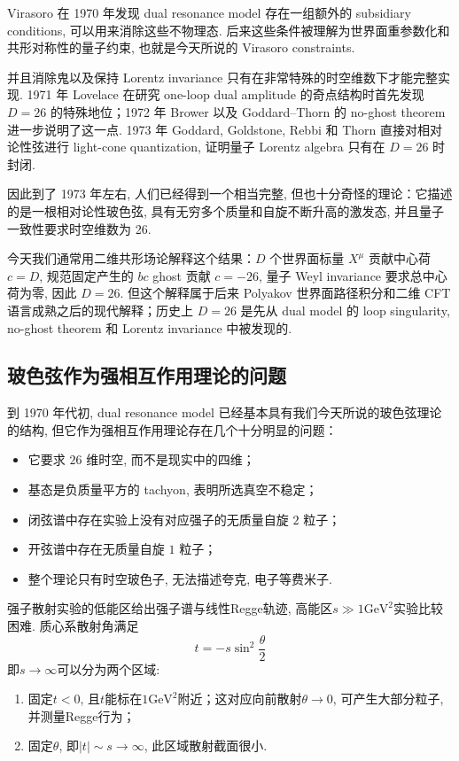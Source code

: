 \documentclass[10pt]{article}
\numberwithin{equation}{section}
\begin{document}
Virasoro 在 1970 年发现 dual resonance model 存在一组额外的 subsidiary conditions, 可以用来消除这些不物理态. 后来这些条件被理解为世界面重参数化和共形对称性的量子约束, 也就是今天所说的 Virasoro constraints. 

并且消除鬼以及保持 Lorentz invariance 只有在非常特殊的时空维数下才能完整实现. 1971 年 Lovelace 在研究 one-loop dual amplitude 的奇点结构时首先发现 $D=26$ 的特殊地位；1972 年 Brower 以及 Goddard–Thorn 的 no-ghost theorem 进一步说明了这一点\cite{Lovelace1971,Brower1972,GoddardThorn1972}. 1973 年 Goddard, Goldstone, Rebbi 和 Thorn 直接对相对论性弦进行 light-cone quantization, 证明量子 Lorentz algebra 只有在 $D=26$ 时封闭\cite{GGRT1973}.

因此到了 1973 年左右, 人们已经得到一个相当完整, 但也十分奇怪的理论：它描述的是一根相对论性玻色弦, 具有无穷多个质量和自旋不断升高的激发态, 并且量子一致性要求时空维数为 26. 

今天我们通常用二维共形场论解释这个结果：$D$ 个世界面标量 $X^\mu$ 贡献中心荷 $c=D$, 规范固定产生的 $bc$ ghost 贡献 $c=-26$, 量子 Weyl invariance 要求总中心荷为零, 因此 $D=26$. 但这个解释属于后来 Polyakov 世界面路径积分和二维 CFT 语言成熟之后的现代解释；历史上 $D=26$ 是先从 dual model 的 loop singularity, no-ghost theorem 和 Lorentz invariance 中被发现的. 

\subsection{玻色弦作为强相互作用理论的问题}

到 1970 年代初, dual resonance model 已经基本具有我们今天所说的玻色弦理论的结构, 但它作为强相互作用理论存在几个十分明显的问题：
\begin{itemize}
  \item 它要求 $26$ 维时空, 而不是现实中的四维；
  \item 基态是负质量平方的 tachyon, 表明所选真空不稳定；
\item 闭弦谱中存在实验上没有对应强子的无质量自旋 $2$ 粒子；
\item 开弦谱中存在无质量自旋 $1$ 粒子；
\item 整个理论只有时空玻色子, 无法描述夸克, 电子等费米子. 
\end{itemize}

强子散射实验的低能区给出强子谱与线性Regge轨迹, 高能区$s\gg 1\mathrm{GeV}^2$实验比较困难. 质心系散射角满足
\begin{equation}
  t=-s\sin^2\frac{\theta}{2}
\end{equation}
即$s\to\infty$可以分为两个区域:
\begin{enumerate}
  \item 固定$t<0$, 且$t$能标在$1\mathrm{GeV}^2$附近；这对应向前散射$\theta\to 0$, 可产生大部分粒子, 并测量Regge行为；
  \item 固定$\theta$, 即$|t|\sim s\to \infty$, 此区域散射截面很小. 
\end{enumerate}
\end{document}
